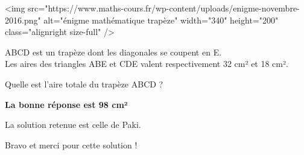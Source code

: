 
%
<img src="https://www.maths-cours.fr/wp-content/uploads/enigme-novembre-2016.png" alt="énigme mathématique trapèze" width="340" height="200" class="alignright size-full" />
\par
[Connaissances requises : à partir de la troisième]
\par

ABCD est un trapèze dont les diagonales se coupent en E.
\\
Les aires des triangles ABE et CDE valent respectivement 32 cm² et 18 cm².
\par
Quelle est l'aire totale du trapèze ABCD ?
\begin{solution}

     \textbf{La bonne réponse est 98 cm²}
\par
     La solution retenue est celle de Paki.
     \par
     Bravo et merci pour cette solution !
     \par
{}%

\end{solution}
